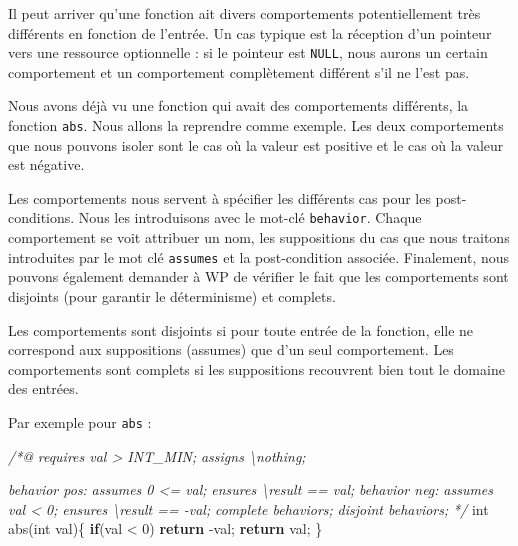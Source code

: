 \documentclass[12pt,francais,]{scrbook}
\newenvironment{Shaded}{}{}
\newcommand{\KeywordTok}[1]{\textcolor[rgb]{0.00,0.44,0.13}{\textbf{{#1}}}}
\newcommand{\DataTypeTok}[1]{\textcolor[rgb]{0.56,0.13,0.00}{{#1}}}
\newcommand{\DecValTok}[1]{\textcolor[rgb]{0.25,0.63,0.44}{{#1}}}
\newcommand{\CommentTok}[1]{\textcolor[rgb]{0.38,0.63,0.69}{\textit{{#1}}}}
\newcommand{\NormalTok}[1]{{#1}}
\begin{document}
Il peut arriver qu'une fonction ait divers comportements potentiellement
très différents en fonction de l'entrée. Un cas typique est la réception
d'un pointeur vers une ressource optionnelle : si le pointeur est
\texttt{NULL}, nous aurons un certain comportement et un comportement
complètement différent s'il ne l'est pas.

Nous avons déjà vu une fonction qui avait des comportements différents,
la fonction \texttt{abs}. Nous allons la reprendre comme exemple. Les
deux comportements que nous pouvons isoler sont le cas où la valeur est
positive et le cas où la valeur est négative.

Les comportements nous servent à spécifier les différents cas pour les
post-conditions. Nous les introduisons avec le mot-clé
\texttt{behavior}. Chaque comportement se voit attribuer un nom, les
suppositions du cas que nous traitons introduites par le mot clé
\texttt{assumes} et la post-condition associée. Finalement, nous pouvons
également demander à WP de vérifier le fait que les comportements sont
disjoints (pour garantir le déterminisme) et complets.

Les comportements sont disjoints si pour toute entrée de la fonction,
elle ne correspond aux suppositions (assumes) que d'un seul
comportement. Les comportements sont complets si les suppositions
recouvrent bien tout le domaine des entrées.

Par exemple pour \texttt{abs} :

\begin{footnotesize}\begin{Shaded}
\begin{Highlighting}[]
\CommentTok{/*@}
\CommentTok{  requires val > INT_MIN;}
\CommentTok{  assigns  \textbackslash{}nothing;}

\CommentTok{  behavior pos:}
\CommentTok{    assumes 0 <= val;}
\CommentTok{    ensures \textbackslash{}result == val;}
\CommentTok{  }
\CommentTok{  behavior neg:}
\CommentTok{    assumes val < 0;}
\CommentTok{    ensures \textbackslash{}result == -val;}
\CommentTok{ }
\CommentTok{  complete behaviors;}
\CommentTok{  disjoint behaviors;}
\CommentTok{*/}
\DataTypeTok{int} \NormalTok{abs(}\DataTypeTok{int} \NormalTok{val)\{}
  \KeywordTok{if}\NormalTok{(val < }\DecValTok{0}\NormalTok{) }\KeywordTok{return} \NormalTok{-val;}
  \KeywordTok{return} \NormalTok{val;}
\NormalTok{\}}
\end{Highlighting}
\end{Shaded}\end{footnotesize}
\end{document}
